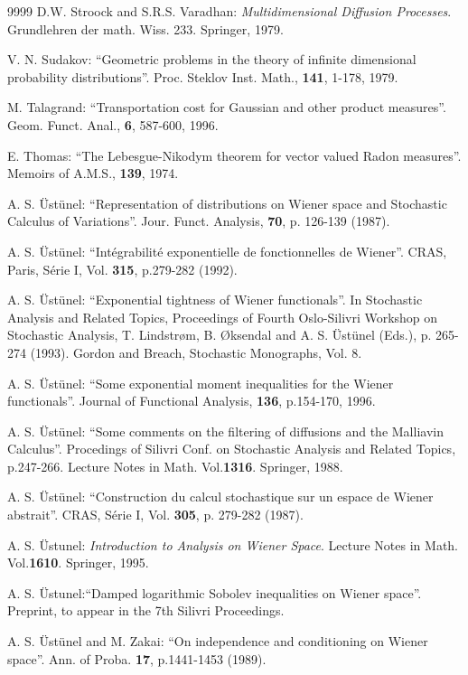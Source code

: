 \documentclass[12pt,a4paper]{book}
\begin{document}
\begin{thebibliography}{9999}
D.W. Stroock and S.R.S. Varadhan: {\sl  Multidimensional
  Diffusion Processes}. Grundlehren der math. Wiss. 233. Springer,
1979.

V. N. Sudakov: ``Geometric problems in the theory of infinite
dimensional probability distributions''. Proc. Steklov Inst. Math.,
{\bf 141}, 1-178, 1979.

M. Talagrand: ``Transportation cost for Gaussian and other product
measures''. Geom. Funct. Anal., {\bf 6}, 587-600, 1996.

E. Thomas:
``The Lebesgue-Nikodym theorem for vector valued Radon
measures''. Memoirs of A.M.S., {\bf  139}, 1974.

A. S. \"Ust\"unel: ``Representation of distributions on Wiener
space and Stochastic Calculus of Variations''. Jour. Funct. Analysis,
{\bf 70}, p. 126-139 (1987).

A. S. \"Ust\"unel: ``Int\'egrabilit\'e exponentielle de
fonctionnelles de Wiener''.
 CRAS, Paris, S\'erie I, Vol. {\bf 315}, p.279-282 (1992).

A. S. \"Ust\"unel: ``Exponential tightness of Wiener
functionals''. In Stochastic Analysis and Related Topics, Proceedings of
Fourth Oslo-Silivri Workshop on Stochastic Analysis, T. Lindstr\o m,
B. \O ksendal and A. S. \"Ust\"unel (Eds.), p. 265-274 (1993).
Gordon and Breach, Stochastic Monographs, Vol. 8.

A. S. \"Ust\"unel: ``Some exponential moment inequalities for
the Wiener functionals''. Journal of Functional Analysis, {\bf 136},
p.154-170, 1996.

A. S. \"Ust\"unel: ``Some comments on the filtering of diffusions
and the Malliavin Calculus''. Procedings of Silivri Conf. on Stochastic
Analysis and Related Topics, p.247-266. Lecture Notes in
Math. Vol.{\bf  1316}.
Springer, 1988.


A. S. \"Ust\"unel: ``Construction du calcul stochastique sur un
espace de Wiener abstrait''. CRAS, S\'erie I, Vol. {\bf 305},
p. 279-282 (1987). 

A. S. \"Ustunel: {\sl Introduction to Analysis on Wiener
  Space}. Lecture Notes in Math. Vol.{\bf 1610}. Springer, 1995.

A. S. \"Ustunel:``Damped logarithmic Sobolev inequalities
  on Wiener space''. Preprint, to appear in the 7th Silivri
  Proceedings.

A. S. \"Ust\"unel and M. Zakai: ``On independence and
conditioning on Wiener space''. Ann. of Proba. {\bf 17}, p.1441-1453 (1989).




\end{thebibliography}
\end{document}
